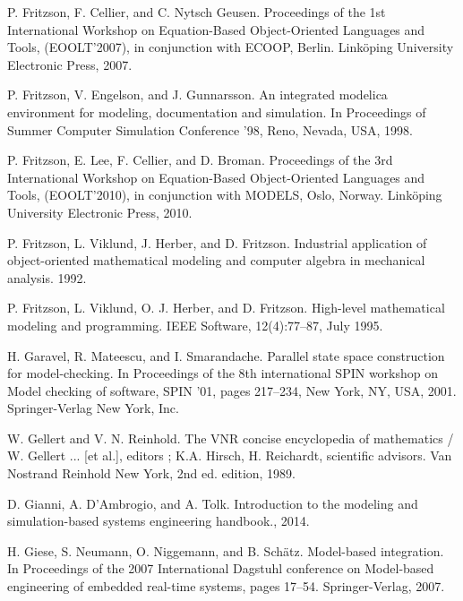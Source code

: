 \begin{description}[style=nextline,leftmargin=12mm,labelwidth=10mm,font=\normalfont]
\item[{[116]}] P. Fritzson, F. Cellier, and C. Nytsch Geusen. Proceedings of the 1st International Workshop on Equation-Based Object-Oriented Languages and Tools, (EOOLT’2007), in conjunction with ECOOP, Berlin. Linköping University Electronic Press, 2007.

\item[{[117]}] P. Fritzson, V. Engelson, and J. Gunnarsson. An integrated modelica environment for modeling, documentation and simulation. In Proceedings of Summer Computer Simulation Conference ’98, Reno, Nevada, USA, 1998.

\item[{[118]}] P. Fritzson, E. Lee, F. Cellier, and D. Broman. Proceedings of the 3rd International Workshop on Equation-Based Object-Oriented Languages and Tools, (EOOLT’2010), in conjunction with MODELS, Oslo, Norway. Linköping University Electronic Press, 2010.

\item[{[119]}] P. Fritzson, L. Viklund, J. Herber, and D. Fritzson. Industrial application of object-oriented mathematical modeling and computer algebra in mechanical analysis. 1992.

\item[{[120]}] P. Fritzson, L. Viklund, O. J. Herber, and D. Fritzson. High-level mathematical modeling and programming. IEEE Software, 12(4):77–87, July 1995.

\item[{[121]}] H. Garavel, R. Mateescu, and I. Smarandache. Parallel state space construction for model-checking. In Proceedings of the 8th international SPIN workshop on Model checking of software, SPIN ’01, pages 217–234, New York, NY, USA, 2001. Springer-Verlag New York, Inc.

\item[{[122]}] W. Gellert and V. N. Reinhold. The VNR concise encyclopedia of mathematics / W. Gellert ... [et al.], editors ; K.A. Hirsch, H. Reichardt, scientific advisors. Van Nostrand Reinhold New York, 2nd ed. edition, 1989.

\item[{[123]}] D. Gianni, A. D’Ambrogio, and A. Tolk. Introduction to the modeling and simulation-based systems engineering handbook., 2014.

\item[{[124]}] H. Giese, S. Neumann, O. Niggemann, and B. Schätz. Model-based integration. In Proceedings of the 2007 International Dagstuhl conference on Model-based engineering of embedded real-time systems, pages 17–54. Springer-Verlag, 2007.


\end{description}
